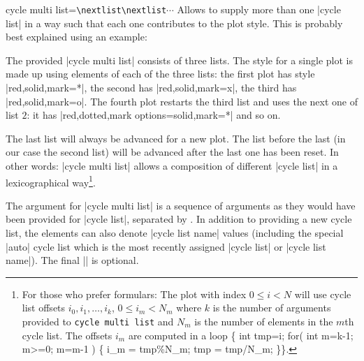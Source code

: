 \begin{pgfplotskey}{cycle multi list=\texttt{\textbackslash nextlist}\texttt{\textbackslash nextlist}$\dotsb$}
	Allows to supply more than one |cycle list| in a way such that each one contributes to the plot style. This is probably best explained using an example:
\begin{codeexample}[]
\end{codeexample}
	\noindent The provided |cycle multi list| consists of three lists. The style for a single plot is made up using elements of each of the three lists: the first plot has style |red,solid,mark=*|, the second has |red,solid,mark=x|, the third has |red,solid,mark=o|. The fourth plot restarts the third list and uses the next one of list $2$: it has |red,dotted,mark options={solid},mark=*| and so on.

	The last list will always be advanced for a new plot. The list before the last (in our case the second list) will be advanced after the last one has been reset. In other words: |cycle multi list| allows a composition of different |cycle list| in a lexicographical way\footnote{For those who prefer formulars: The plot with index $0 \le i < N$ will use cycle list offsets $i_0,i_1,\dotsc,i_k$, $0 \le i_m < N_m$ where $k$ is the number of arguments provided to \texttt{cycle multi list} and $N_m$ is the number of elements in the $m$th cycle list. The offsets $i_m$ are computed in a loop {\ttfamily \{ int tmp=i;  for( int m=k-1; m>=0; m=m-1 ) \{ i\_m = tmp\%N\_m; tmp = tmp/N\_m; \}\}}.}.

	The argument for |cycle multi list| is a sequence of arguments as they would have been provided for |cycle list|, separated by \declareandlabel{\nextlist}. In addition to providing a new cycle list, the  elements can also denote |cycle list name| values (including the special |auto| cycle list which is the most recently assigned |cycle list| or |cycle list name|). The final |\nextlist| is optional.


\end{pgfplotskey}
